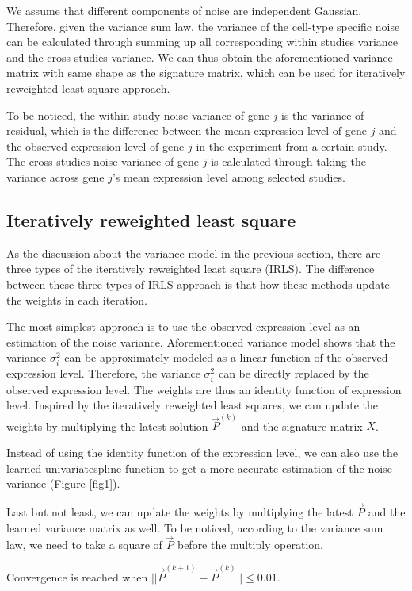 \documentclass[10pt, a4paper, oneside]{article}
\begin{document}
We assume that different components of noise are independent Gaussian. Therefore, given the variance sum law, the variance of the cell-type specific noise can be calculated
through summing up all corresponding within studies variance and the cross studies variance. We can thus obtain the aforementioned variance matrix with same shape as
the signature matrix, which can be used for iteratively reweighted least square approach.

To be noticed, the within-study noise variance of gene $j$ is the variance of residual, which is the difference between the mean expression level of gene $j$ and the observed expression level of gene $j$ in the experiment from 
a certain study. The cross-studies noise variance of gene $j$ is calculated through taking the variance across gene $j$'s mean expression level among selected studies.

\subsection{Iteratively reweighted least square}
\justify
As the discussion about the variance model in the previous section, there are three types of the iteratively
reweighted least square (IRLS). The difference between these three types of IRLS approach is that how these
methods update the weights in each iteration.

The most simplest approach is to use the observed expression level as an estimation of the noise variance.
Aforementioned variance model shows that the variance $\sigma_i^2$ can be approximately modeled as a linear function of the observed expression level. 
Therefore, the variance $\sigma_i^2$ can be directly replaced by the observed expression level. The weights are thus an identity function of
expression level. Inspired by the iteratively reweighted least squares, we can update the weights by multiplying the latest solution $\vec{P}^{(k)}$ and the signature matrix $X$.

Instead of using the identity function of the expression level, we can also use the learned univariatespline function to get a more accurate estimation
of the noise variance (Figure \ref{fig1}). 

Last but not least, we can update the weights by multiplying the latest $\vec{P}$ and the learned variance matrix as well.
To be noticed, according to the variance sum law, we need to take a square of $\vec{P}$ before the multiply operation.
 
Convergence is reached when $||\vec{P}^{(k+1)} - \vec{P}^{(k)}|| \leq 0.01$.
\end{document}
